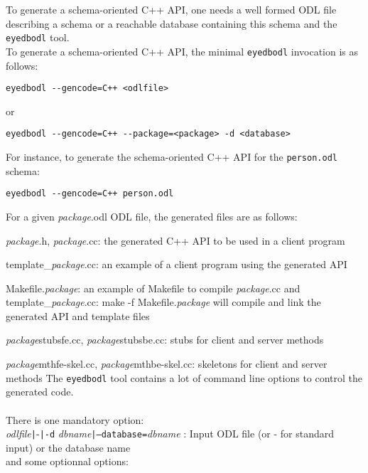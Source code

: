 To generate a schema-oriented C++ API, one needs a well formed ODL
file describing a schema or a reachable database containing this schema
and the \texttt{eyedbodl} tool.
\\
To generate a schema-oriented C++ API, the minimal \texttt{eyedbodl} invocation
is as follows:
\begin{verbatim}
eyedbodl --gencode=C++ <odlfile>
\end{verbatim}
or
\begin{verbatim}
eyedbodl --gencode=C++ --package=<package> -d <database>
\end{verbatim}
For instance, to generate the schema-oriented C++ API for the \texttt{person.odl}
schema:
\begin{verbatim}
eyedbodl --gencode=C++ person.odl
\end{verbatim}
For a given \emph{package}.odl ODL file, the generated files are as follows:
\bi
\item \emph{package}.h, \emph{package}.cc: the generated C++ API to be used in
a client program
\item template\_\emph{package}.cc: an example of a client program using the generated
API
\item Makefile.\emph{package}: an example of Makefile to compile \emph{package}.cc and
template\_\emph{package}.cc: make -f Makefile.\emph{package} will compile
and link the generated API and template files
\item \emph{package}stubsfe.cc, \emph{package}stubsbe.cc: stubs for client and server methods
\item \emph{package}mthfe-skel.cc, \emph{package}mthbe-skel.cc: skeletons for
client and server methods
\ei
The \texttt{eyedbodl} tool contains a lot of command line options to
control the generated code.
\\
\\
There is one mandatory option:\\
\emph{odlfile}\texttt{|}-\texttt{|}\texttt{-d} \emph{dbname}\texttt{|}\texttt{--database=}\emph{dbname} : Input ODL file (or - for standard input) or the database name\\
and some optionnal options:
